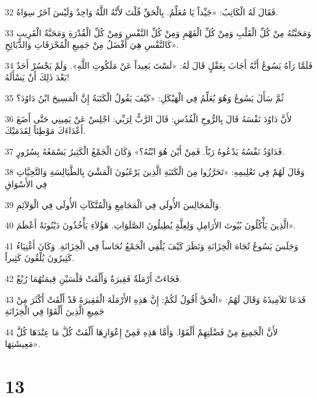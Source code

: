 \par 32 فَقَالَ لَهُ الْكَاتِبُ: «جَيِّداً يَا مُعَلِّمُ. بِالْحَقِّ قُلْتَ لأَنَّهُ اللَّهُ وَاحِدٌ وَلَيْسَ آخَرُ سِوَاهُ.
\par 33 وَمَحَبَّتُهُ مِنْ كُلِّ الْقَلْبِ وَمِنْ كُلِّ الْفَهْمِ وَمِنْ كُلِّ النَّفْسِ وَمِنْ كُلِّ الْقُدْرَةِ وَمَحَبَّةُ الْقَرِيبِ كَالنَّفْسِ هِيَ أَفْضَلُ مِنْ جَمِيعِ الْمُحْرَقَاتِ وَالذَّبَائِحِ».
\par 34 فَلَمَّا رَآهُ يَسُوعُ أَنَّهُ أَجَابَ بِعَقْلٍ قَالَ لَهُ: «لَسْتَ بَعِيداً عَنْ مَلَكُوتِ اللَّهِ». وَلَمْ يَجْسُرْ أَحَدٌ بَعْدَ ذَلِكَ أَنْ يَسْأَلَهُ!
\par 35 ثُمَّ سَأَلَ يَسُوعُ وَهُوَ يُعَلِّمُ فِي الْهَيْكَلِ: «كَيْفَ يَقُولُ الْكَتَبَةُ إِنَّ الْمَسِيحَ ابْنُ دَاوُدَ؟
\par 36 لأَنَّ دَاوُدَ نَفْسَهُ قَالَ بِالرُّوحِ الْقُدُسِ: قَالَ الرَّبُّ لِرَبِّي: اجْلِسْ عَنْ يَمِينِي حَتَّى أَضَعَ أَعْدَاءَكَ مَوْطِئاً لِقَدَمَيْكَ.
\par 37 فَدَاوُدُ نَفْسُهُ يَدْعُوهُ رَبّاً. فَمِنْ أَيْنَ هُوَ ابْنُهُ؟» وَكَانَ الْجَمْعُ الْكَثِيرُ يَسْمَعُهُ بِسُرُورٍ.
\par 38 وَقَالَ لَهُمْ فِي تَعْلِيمِهِ: «تَحَرَّزُوا مِنَ الْكَتَبَةِ الَّذِينَ يَرْغَبُونَ الْمَشْيَ بِالطَّيَالِسَةِ وَالتَّحِيَّاتِ فِي الأَسْوَاقِ
\par 39 وَالْمَجَالِسَ الأُولَى فِي الْمَجَامِعِ وَالْمُتَّكَآتِ الأُولَى فِي الْوَلاَئِمِ.
\par 40 الَّذِينَ يَأْكُلُونَ بُيُوتَ الأَرَامِلِ وَلِعِلَّةٍ يُطِيلُونَ الصَّلَوَاتِ. هَؤُلاَءِ يَأْخُذُونَ دَيْنُونَةً أَعْظَمَ».
\par 41 وَجَلَسَ يَسُوعُ تُجَاهَ الْخِزَانَةِ وَنَظَرَ كَيْفَ يُلْقِي الْجَمْعُ نُحَاساً فِي الْخِزَانَةِ. وَكَانَ أَغْنِيَاءُ كَثِيرُونَ يُلْقُونَ كَثِيراً.
\par 42 فَجَاءَتْ أَرْمَلَةٌ فَقِيرَةٌ وَأَلْقَتْ فَلْسَيْنِ قِيمَتُهُمَا رُبْعٌ.
\par 43 فَدَعَا تَلاَمِيذَهُ وَقَالَ لَهُمُ: «الْحَقَّ أَقُولُ لَكُمْ: إِنَّ هَذِهِ الأَرْمَلَةَ الْفَقِيرَةَ قَدْ أَلْقَتْ أَكْثَرَ مِنْ جَمِيعِ الَّذِينَ أَلْقَوْا فِي الْخِزَانَةِ
\par 44 لأَنَّ الْجَمِيعَ مِنْ فَضْلَتِهِمْ أَلْقَوْا. وَأَمَّا هَذِهِ فَمِنْ إِعْوَازِهَا أَلْقَتْ كُلَّ مَا عِنْدَهَا كُلَّ مَعِيشَتِهَا».

\chapter{13}

